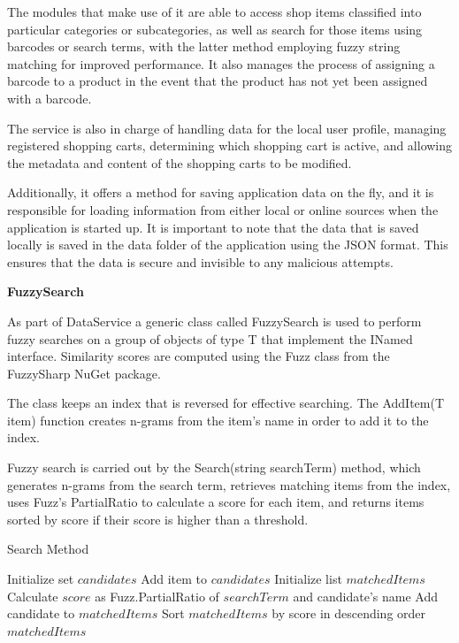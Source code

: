 The modules that make use of it are able to access shop items classified into particular categories or subcategories, as well as search for those items using barcodes or search terms, with the latter method employing fuzzy string matching for improved performance. It also manages the process of assigning a barcode to a product in the event that the product has not yet been assigned with a barcode. 

\pagebreak

The service is also in charge of handling data for the local user profile, managing registered shopping carts, determining which shopping cart is active, and allowing the metadata and content of the shopping carts to be modified.

Additionally, it offers a method for saving application data on the fly, and it is responsible for loading information from either local or online sources when the application is started up. It is important to note that the data that is saved locally is saved in the data folder of the application using the JSON format. This ensures that the data is secure and invisible to any malicious attempts. 

\noindent\textbf{FuzzySearch}

As part of DataService a generic class called FuzzySearch is used to perform fuzzy searches on a group of objects of type T that implement the INamed interface. Similarity scores are computed using the Fuzz class from the FuzzySharp NuGet package.

The class keeps an index that is reversed for effective searching. The AddItem(T item) function creates n-grams from the item's name in order to add it to the index.

Fuzzy search is carried out by the Search(string searchTerm) method, which generates n-grams from the search term, retrieves matching items from the index, uses Fuzz's PartialRatio to calculate a score for each item, and returns items sorted by score if their score is higher than a threshold.

\begin{algorithm}
	\caption{Search Method}
	\begin{algorithmic}
		\State Initialize set $candidates$
		\State Add item to $candidates$
		\EndFor
		\EndIf
		\EndFor
		\State Initialize list $matchedItems$
		\State Calculate $score$ as Fuzz.PartialRatio of $searchTerm$ and candidate's name
		\State Add candidate to $matchedItems$
		\EndIf
		\EndFor
		\State Sort $matchedItems$ by score in descending order
		\newline
		\Return $matchedItems$
	\end{algorithmic}
\end{algorithm}

